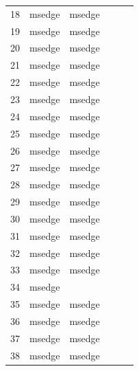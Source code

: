 \documentclass[a4paper,twoside,12pt]{book}
\begin{document}
\begin{appendices}
\begin{table}
\begin{tabular}{l|l|l|l|l|l}
		18  &  msedge &         msedge &                &                &                \\
		19  &  msedge &         msedge &                &                &                \\
		20  &  msedge &         msedge &                &                &                \\
		21  &  msedge &         msedge &                &                &                \\
		22  &  msedge &         msedge &                &                &                \\
		23  &  msedge &         msedge &                &                &                \\
		24  &  msedge &         msedge &                &                &                \\
		25  &  msedge &         msedge &                &                &                \\
		26  &  msedge &         msedge &                &                &                \\
		27  &  msedge &         msedge &                &                &                \\
		28  &  msedge &         msedge &                &                &                \\
		29  &  msedge &         msedge &                &                &                \\
		30  &  msedge &         msedge &                &                &                \\
		31  &  msedge &         msedge &                &                &                \\
		32  &  msedge &         msedge &                &                &                \\
		33  &  msedge &         msedge &                &                &                \\
		34  &  msedge &                &                &                &                \\
		35  &  msedge &         msedge &                &                &                \\
		36  &  msedge &         msedge &                &                &                \\
		37  &  msedge &         msedge &                &                &                \\
		38  &  msedge &         msedge &                &                &                \\

\end{tabular}
\end{table}
\end{appendices}
\end{document}
